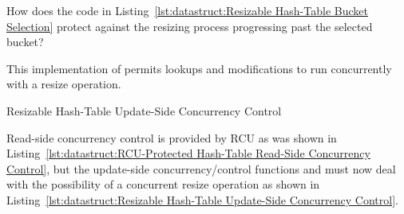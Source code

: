 \QuickQuiz{}
	How does the code in
	Listing~\ref{lst:datastruct:Resizable Hash-Table Bucket Selection}
	protect against the resizing process progressing past the
	selected bucket?
 \QuickQuizEnd

This implementation of  permits lookups and
modifications to run concurrently with a resize operation.

\begin{listing}[tb]

\caption{Resizable Hash-Table Update-Side Concurrency Control}
\label{lst:datastruct:Resizable Hash-Table Update-Side Concurrency Control}
\end{listing}

Read-side concurrency control is provided by RCU as was shown in
Listing~\ref{lst:datastruct:RCU-Protected Hash-Table Read-Side Concurrency Control},
but the update-side concurrency\-/control functions
 and 
must now deal with the possibility of a
concurrent resize operation as shown in
Listing~\ref{lst:datastruct:Resizable Hash-Table Update-Side Concurrency Control}.

